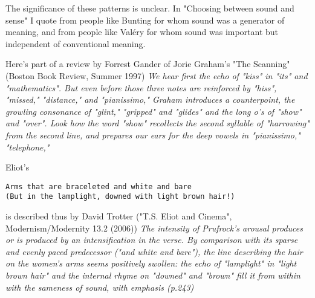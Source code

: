 \documentclass[11pt]{article}
\begin{document}
The significance of these patterns is unclear. In "Choosing between sound and sense" I quote from people like Bunting for whom sound was a generator of meaning, and from people like Valéry for whom sound was important but independent of conventional meaning.

 Here's part of a review by Forrest Gander of Jorie Graham's "The Scanning" (Boston Book Review, Summer 1997) \textit{We hear first the echo of "kiss" in "its" and "mathematics". But even before those three notes are reinforced by "hiss", "missed," "distance," and "pianissimo," Graham introduces a counterpoint, the growling consonance of "glint," "gripped" and "glides" and the long o's of "show" and "over". Look how the word "show" recollects the second syllable of "harrowing" from the second line, and prepares our ears for the deep vowels in "pianissimo," "telephone,"}

Eliot's
\begin{verbatim}
Arms that are braceleted and white and bare
(But in the lamplight, downed with light brown hair!)
\end{verbatim}
is described thus by David Trotter ("T.S. Eliot and Cinema", Modernism/Modernity 13.2 (2006))
\textit{The intensity of Prufrock's arousal produces or is produced by an intensification in the verse. By comparison with its sparse and evenly paced predecessor ("and white and bare"), the line describing the hair on the women's arms seems positively swollen: the echo of "lamplight" in "light brown hair" and the internal rhyme on "downed" and "brown" fill it from within with the sameness of sound, with emphasis (p.243)}
\end{document}
